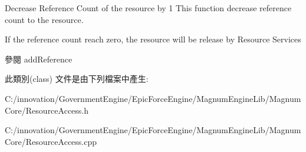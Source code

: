 Decrease Reference Count of the resource by 1 This function decrease reference count to the resource. 

If the reference count reach zero, the resource will be release by Resource Services \begin{DoxySeeAlso}{參閱}
add\+Reference 
\end{DoxySeeAlso}


此類別(class) 文件是由下列檔案中產生\+:\begin{DoxyCompactItemize}
\item 
C\+:/innovation/\+Government\+Engine/\+Epic\+Force\+Engine/\+Magnum\+Engine\+Lib/\+Magnum\+Core/Resource\+Access.\+h\item 
C\+:/innovation/\+Government\+Engine/\+Epic\+Force\+Engine/\+Magnum\+Engine\+Lib/\+Magnum\+Core/Resource\+Access.\+cpp\end{DoxyCompactItemize}
